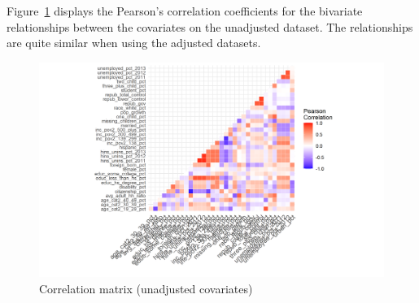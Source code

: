 Figure~\ref{fig:corrmatrix} displays the Pearson's correlation coefficients for the bivariate relationships between the covariates on the unadjusted dataset. The relationships are quite similar when using the adjusted datasets.

\begin{figure}[h!]
\begin{center}
    \caption{Correlation matrix (unadjusted covariates)}
    \label{fig:corrmatrix}
    \includegraphics[scale=0.6]{01_Plots/correlation-plot-c1-sigma-zero.png}
\end{center}
\end{figure}

\clearpage